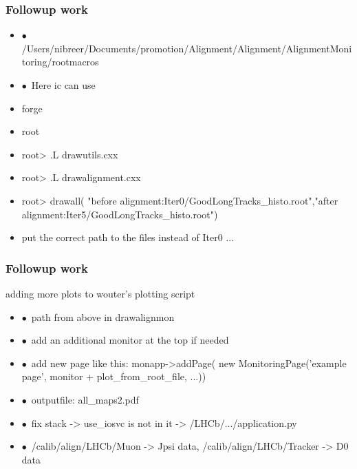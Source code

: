 \documentclass[aspectratio=1610, 12pt, xcolor=dvipsnames]{beamer}
\begin{document}
\begin{frame}\frametitle{Followup work}
  \begin{itemize}
    \item $\bullet$\, /Users/nibreer/Documents/promotion/Alignment/Alignment/AlignmentMonitoring/rootmacros
    \item $\bullet$\, Here ic can use 
    \item forge
    \item root
    \item root> .L drawutils.cxx
    \item root> .L drawalignment.cxx
    \item root> drawall( "before alignment:Iter0/GoodLongTracks_histo.root","after alignment:Iter5/GoodLongTracks_histo.root")
    \item put the correct path to the files instead of Iter0 ...
  \end{itemize}
\end{frame}

\begin{frame}\frametitle{Followup work}
  adding more plots to wouter's plotting script
  \begin{itemize}
    \item $\bullet$\, path from above in drawalignmon
    \item $\bullet$\, add an additional monitor at the top if needed
    \item $\bullet$\, add new page like this: monapp->addPage( new MonitoringPage('example page', monitor + plot_from_root_file, ...))
    \item $\bullet$\, outputfile: all_maps2.pdf
    \item $\bullet$\, fix stack -> use_iosvc is not in it -> /LHCb/.../application.py
    \item $\bullet$\, /calib/align/LHCb/Muon -> Jpsi data, /calib/align/LHCb/Tracker -> D0 data
  \end{itemize}
\end{frame}
\end{document}
